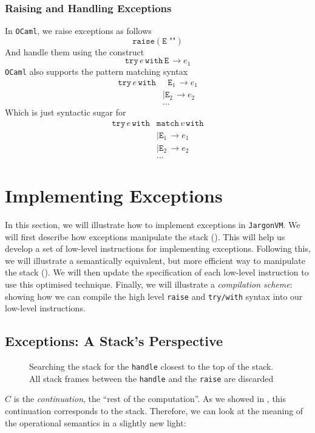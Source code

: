 \subsubsection{Raising and Handling Exceptions}
In \texttt{OCaml}, we raise exceptions as follows
\[\texttt{raise}(\texttt{E ""})\]
And handle them using the construct
\[\texttt{try} \,e \, \texttt{with} \, \texttt{E} \, \to e_1 \]
\texttt{OCaml} also supports the pattern matching syntax
\[\begin{array}{ll}
    \texttt{try} \,e \, \texttt{with} & \; \, \, \texttt{E}_1 \, \to e_1  \\ 
    & \mid \texttt{E}_2 \, \to e_2 \\
    & \ldots
\end{array}   \]
Which is just syntactic sugar for 
\[\begin{array}{ll}
    \texttt{try} \,e\, \texttt{with} & \texttt{match} \, v \, \texttt{with} \\
    & \mid \texttt{E}_1 \, \to e_1  \\ 
    & \mid \texttt{E}_2 \, \to e_2 \\
    & \ldots
\end{array}   \]

\section{Implementing Exceptions}
In this section, we will illustrate how to implement exceptions in \texttt{JargonVM}. We will first describe how exceptions manipulate the stack (). This will help us develop a set of low-level instructions for implementing exceptions. Following this, we will illustrate a semantically equivalent, but more efficient way to manipulate the stack (). We will then update the specification of each low-level instruction to use this optimised technique. Finally, we will illustrate a \textit{compilation scheme}: showing how we can compile the high level \texttt{raise} and \texttt{try/with} syntax into our low-level instructions.

\subsection{Exceptions: A Stack's Perspective}\label{section:stack-manipulation}
\begin{figure}[H]
    \centering
    \caption{Searching the stack for the \texttt{handle} closest to the top of the stack. All stack frames between the \texttt{handle} and the \texttt{raise} are discarded}
    \label{fig:stack-searching}
\end{figure}
$C$ is the \textit{continuation}, the ``rest of the computation''. As we showed in , this continuation corresponds to the stack. Therefore, we can look at the meaning of the operational semantics in a slightly new light:

